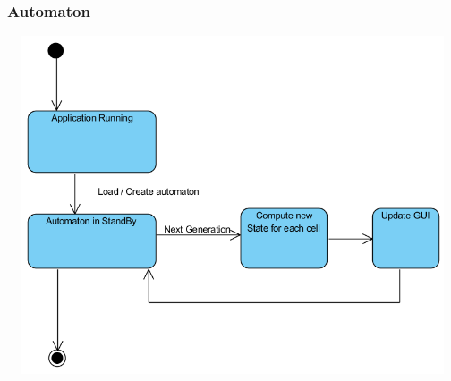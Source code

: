 \documentclass{article}
\begin{document}
	\subsubsection{Automaton}
		\hspace{-90pt}
		\includegraphics[width=150mm, height=100mm]{images/state_automaton_d.png} \\	
		
	
\end{document}
